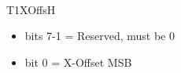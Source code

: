 \\
T1XOffsH
\begin{itemize}
\item bits 7-1 = Reserved, must be 0
\item bit 0 = X-Offset MSB
\end{itemize}

